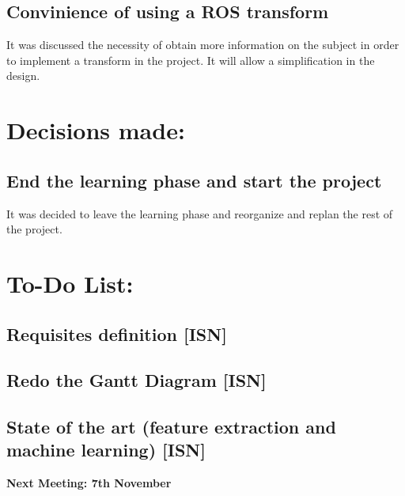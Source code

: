 \documentclass{article}
\newenvironment{myindentpar}[1]%
 {\begin{list}{}%
         {\setlength{\leftmargin}{#1}}%
         \item[]%
 }
 {\end{list}}
\begin{document}
	\subsection{Convinience of using a ROS transform}
		\begin{myindentpar}{1cm} 
		It was discussed the necessity of obtain more information on the subject in order to implement a transform in the project. It will allow a simplification in the design. 
		\end{myindentpar}




\section{\LARGE Decisions made:}
	\subsection{End the learning phase and start the project}
		\begin{myindentpar}{1cm} 
		It was decided to leave the learning phase and reorganize and replan the rest of the project. 
		\end{myindentpar}


\section{\LARGE To-Do List: }
	\subsection{Requisites definition [ISN]}
		\begin{myindentpar}{1cm} 
		
		\end{myindentpar}
		
	\subsection{Redo the Gantt Diagram [ISN]}
		\begin{myindentpar}{1cm} 
		
		\end{myindentpar}
		
	\subsection{State of the art (feature extraction and machine learning) [ISN]}
		\begin{myindentpar}{1cm} 
		
		\end{myindentpar}
	


\begin {center}
{\Large \textbf{Next Meeting: 7th November}}
\end{center}
\end{document}
